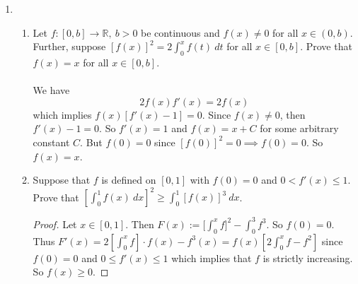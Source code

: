 \documentclass[12pt,letterpaper]{article}
\newcommand{\R}{\mathbb{R}}
\theoremstyle{case}
\theoremstyle{definition}
\begin{document}
\begin{enumerate}
\begin{enumerate}
\begin{proof}
\begin{align*}
					&= e^1f(1)-e^0f(0) \\
					&= e\cdot 0 - 1 \cdot 0 \\
					&= 0 - 0 \\
					&= 0
				\end{align*}
				$\therefore\ \displaystyle\int_{0}^{1} e^x\left[f(x)+f'(x)\right]\ dx = 0$.
			\end{proof}
		\end{enumerate}
		\item
		\begin{enumerate}
			\item Let $f:[0,b] \to \R,\ b>0$ be continuous and $f(x) \neq 0$ for all $x \in (0,b)$. Further, suppose $[f(x)]^2 = 2 \displaystyle\int_{0}^{x} f(t)\ dt$ for all $x \in [0,b]$. Prove that $f(x)=x$ for all $x \in [0,b]$.\\\\We have
			\[2f(x)f'(x)=2f(x)\]
			which implies $f(x)[f'(x)-1]=0$. Since $f(x) \neq 0$, then $f'(x)-1=0$. So $f'(x)=1$ and $f(x)=x+C$ for some arbitrary constant $C$. But $f(0)=0$ since $[f(0)]^2=0\implies f(0)=0$. So $f(x)=x$.\\
			\item Suppose that $f$ is defined on $[0,1]$ with $f(0)=0$ and $0<f'(x) \leq 1$. Prove that $\left[\displaystyle\int_{0}^{1} f(x)\ dx\right]^2 \geq \displaystyle\int_{0}^{1} [f(x)]^3\ dx$. 
			\begin{proof}
				Let $x \in [0,1]$. Then $F(x):=\big[\int_{0}^{x} f\big] ^2 - \int_{0}^{3} f^3$. So $f(0)=0$. Thus $F'(x)=2\left[\int_{0}^{x} f\right] \cdot f(x) - f^3(x)=f(x)\left[2\int_{0}^{x} f-f^2\right]$ since $f(0)=0$ and $0 \leq f'(x) \leq 1$ which implies that $f$ is strictly increasing. So $f(x)\geq 0$.
			\end{proof}
		\end{enumerate}
	\end{enumerate}
\end{document}
